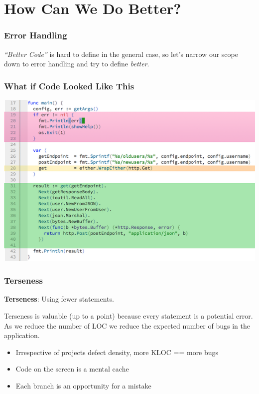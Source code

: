 \documentclass{beamer}
\begin{document}
\section{How Can We Do Better?}
\begin{frame}
  \frametitle{Error Handling}
  {\it ``Better Code''} is hard to define in the general case, so let's
  narrow our scope down to error handling and try to define
  {\it better}.
\end{frame}

\begin{frame}
  \frametitle{What if Code Looked Like This}
  \begin{center}
    \includegraphics[width=.85\paperwidth]{images/small/monadic_highlighted}
  \end{center}
\end{frame}

\begin{frame}
  \frametitle{Terseness}
  {\bf Terseness}: Using fewer statements.
  \par\pause
  Terseness is valuable (up to a point) because every statement is a
  potential error.  As we reduce the number of LOC we reduce the
  expected number of bugs in the application.
  \vfill
  \begin{itemize}
  \item Irrespective of projects defect density, more KLOC == more bugs
  \item Code on the screen is a mental cache
  \item Each branch is an opportunity for a mistake
  \end{itemize}
\end{frame}
\end{document}
